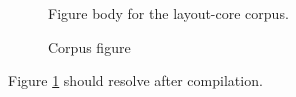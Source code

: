 \documentclass{article}
\begin{document}
\begin{figure}
Figure body for the layout-core corpus.
\caption{Corpus figure}
\label{fig:corpus}
\end{figure}

Figure \ref{fig:corpus} should resolve after compilation.
\end{document}
